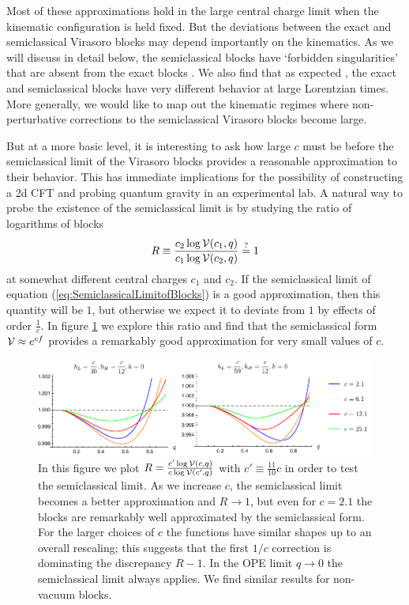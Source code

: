 \documentclass[12pt]{article}
\numberwithin{equation}{section}
\newcommand{\be}{\begin{eqnarray}}
\newcommand{\ee}{\end{eqnarray}}
\newcommand{\CV}{{\cal V}}
\begin{document}
Most of these approximations hold in the large central charge limit when the kinematic configuration is held fixed.  But the deviations between the exact and semiclassical Virasoro blocks may depend importantly on the kinematics.  As we will discuss in detail below, the semiclassical blocks have `forbidden singularities' that are absent from the exact blocks \cite{Fitzpatrick:2016ive}.  We also find that as expected \cite{Fitzpatrick:2016ive, Fitzpatrick:2016mjq}, the exact and semiclassical blocks have very different behavior at large Lorentzian times.  More generally, we would like to map out the kinematic regimes where non-perturbative corrections to the semiclassical Virasoro blocks become large.  

But at a more basic level, it is interesting to ask how large $c$ must be before the semiclassical limit of the Virasoro blocks provides a reasonable approximation to their behavior.  This has immediate implications for the possibility of constructing a 2d CFT and probing quantum gravity in an experimental lab.  A natural way to probe the existence of the semiclassical limit is by studying the ratio of logarithms of blocks
\be
R \equiv \frac{ c_2 \log \CV(c_1,q)}{c_1 \log \CV(c_2,q)} \stackrel{?}{=} 1
\ee
at somewhat different central charges $c_1$ and $c_2$.  If the semiclassical limit of equation (\ref{eq:SemiclassicalLimitofBlocks}) is a good approximation, then this quantity will be $1$, but otherwise we expect it to deviate from $1$ by effects of order $\frac{1}{c}$. In figure \ref{fig:RatioOfLogV} we explore this ratio and find that the semiclassical form $\CV \approx e^{c f}$ provides a remarkably good approximation for very small values of $c$.

\begin{figure}
\centering
\includegraphics[scale=0.95]{RatioOfLogV}	
\caption{In this figure we plot $R = \frac{ c' \log \CV(c,q)}{c \log \CV(c',q)}$ with  $c' \equiv \frac{11}{10}c$ in order to test the semiclassical limit. As we increase $c$, the semiclassical limit becomes a better approximation and $R \to 1$, but even for $c = 2.1$ the blocks are remarkably well approximated by the semiclassical form. For the larger choices of $c$ the functions have similar shapes up to an overall rescaling; this suggests that the first $1/c$ correction is dominating the discrepancy $R-1$.  In the OPE limit $q\rightarrow 0$ the semiclassical limit always applies. We find similar results for non-vacuum blocks. }
\label{fig:RatioOfLogV}
\end{figure}
\end{document}
